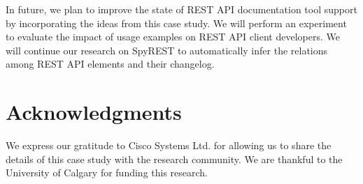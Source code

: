 \documentclass[10pt, conference]{IEEEtran}
\begin{document}
In future, we plan to improve the state of REST API documentation tool support by incorporating the ideas from this case study. We will perform an experiment to evaluate the impact of usage examples on REST API client developers. We will continue our research on SpyREST to automatically infer the relations among REST API elements and their changelog.

\section*{Acknowledgments}
\footnotesize
We express our gratitude to Cisco Systems Ltd. for allowing us to share the details of this case study with the research community. We are thankful to the University of Calgary for funding this research.
\normalsize




%
%



%
%
\end{document}
